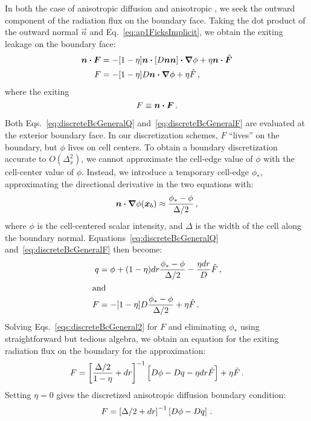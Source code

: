 In both the case of anisotropic diffusion and anisotropic \Pone, we seek the
outward component of the radiation flux on the boundary face. Taking the dot
product of the outward normal $\vec{n}$ and Eq.~\eqref{eq:ap1FicksImplicit}, we
obtain the exiting leakage on the boundary face:
\begin{align}\nonumber
  \bm{n} \bm{\cdot}\bm{F}
  &= - [1 - \eta]\bm{n} \bm{\cdot} \left[ D \bm{n} \bm{n}  \right] \bm{\cdot} \bm{\nabla} \phi
  + \eta \bm{n} \bm{\cdot}\hat{\bm{F}}
  \\ \label{eq:discreteBcGeneralF}
  F &= - [1 - \eta] D \bm{n} \bm{\cdot} \bm{\nabla} \phi + \eta \hat{F} \,,
\end{align}
where the exiting 
\begin{equation*}
  F \equiv \bm{n} \bm{\cdot} \bm{F} \,.
\end{equation*}

Both Eqs.~\eqref{eq:discreteBcGeneralQ} and~\eqref{eq:discreteBcGeneralF}
are evaluated at the exterior boundary face.  In our discretization schemes, 
$F$ ``lives'' on the boundary, but $\phi$ lives on cell centers. To obtain a
boundary discretization accurate to $O(\Delta_x^2)$, we cannot approximate the
cell-edge value of $\phi$ with the cell-center value of $\phi$. Instead, we
introduce a temporary cell-edge $\phi_*$, approximating the directional
derivative in the two equations with:
\begin{equation*}
  \bm{n} \bm{\cdot} \bm{\nabla} \phi(\bm{x}_b) \approx \frac{\phi_* - \phi}{\Delta/2}\,,
\end{equation*}
where $\phi$ is the cell-centered scalar intensity, and $\Delta$ is the width of
the cell along the boundary normal. Equations~\eqref{eq:discreteBcGeneralQ}
and~\eqref{eq:discreteBcGeneralF} then become:
\begin{subequations}\label{eqs:discreteBcGeneral2}
  \begin{align}\label{eq:discreteBcGeneralQ2}
 q &=  \phi + (1 - \eta) dr \frac{\phi_* - \phi}{\Delta/2}
  - \frac{\eta dr}{D} \hat{F} \,,
  \\ 
  \intertext{and} \label{eq:discreteBcGeneralQ2}
  F &= - [1 - \eta] D\frac{\phi_* - \phi}{\Delta/2} + \eta \hat{F} \,.
  \end{align}
\end{subequations}
Solving Eqs.~\eqref{eqs:discreteBcGeneral2} for $F$ and eliminating $\phi_*$
using straightforward but tedious algebra, we obtain an equation for the exiting
radiation flux on the boundary for the \APone approximation:
\begin{equation}\label{eq:discreteBcAponeFinal}
  F = \left[ \frac{\Delta/2}{1 - \eta} + dr \right]^{-1}
  \left[ D\phi - Dq - \eta dr \hat{F} \right]
  + \eta \hat{F} \,.
\end{equation}
Setting $\eta=0$ gives the discretized anisotropic diffusion boundary condition:
\begin{equation}\label{eq:discreteBcAdFinal}
  F = \left[ \Delta/2 + dr \right]^{-1} \left[ D\phi - Dq  \right] \,.
\end{equation}

